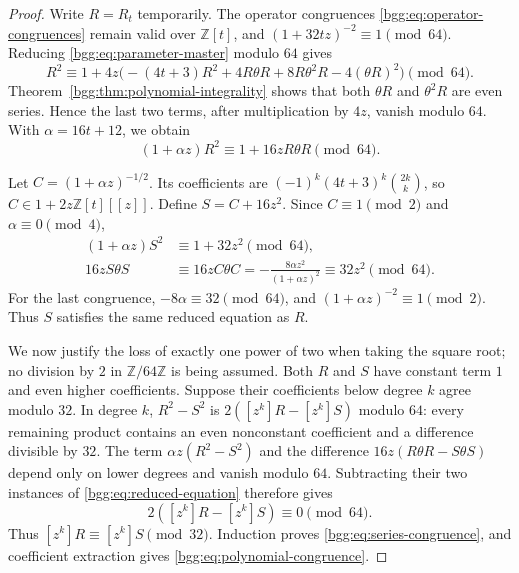 \documentclass[11pt,a4paper]{article}
\numberwithin{equation}{section}
\theoremstyle{definition}
\theoremstyle{remark}
\theoremstyle{definition}
\newcommand{\Z}{\mathbb Z}
\begin{document}
\begin{proof}
Write $R=R_t$ temporarily. The operator congruences
\eqref{bgg:eq:operator-congruences} remain valid over $\Z[t]$, and
$(1+32tz)^{-2}\equiv1\pmod{64}$. Reducing
\eqref{bgg:eq:parameter-master} modulo $64$ gives
\begin{equation}\label{bgg:eq:mod64-intermediate}
 R^2\equiv1+4z\bigl(-(4t+3)R^2+4R\theta R
                 +8R\theta^2R-4(\theta R)^2\bigr)\pmod{64}.
\end{equation}
Theorem~\ref{bgg:thm:polynomial-integrality} shows that both $\theta R$ and
$\theta^2R$ are even series. Hence the last two terms, after multiplication
by $4z$, vanish modulo $64$. With $\alpha=16t+12$, we obtain
\begin{equation}\label{bgg:eq:reduced-equation}
 (1+\alpha z)R^2\equiv1+16zR\theta R\pmod{64}.
\end{equation}

Let $C=(1+\alpha z)^{-1/2}$. Its coefficients are
$(-1)^k(4t+3)^k\binom{2k}{k}$, so $C\in1+2z\Z[t][[z]]$. Define
$S=C+16z^2$. Since $C\equiv1\pmod2$ and $\alpha\equiv0\pmod4$,
\begin{align*}
 (1+\alpha z)S^2&\equiv1+32z^2\pmod{64},\\
 16zS\theta S&\equiv16zC\theta C
       =-\frac{8\alpha z^2}{(1+\alpha z)^2}
       \equiv32z^2\pmod{64}.
\end{align*}
For the last congruence, $-8\alpha\equiv32\pmod{64}$, and
$(1+\alpha z)^{-2}\equiv1\pmod2$. Thus $S$ satisfies the same reduced
equation as $R$.

We now justify the loss of exactly one power of two when taking the square
root; no division by $2$ in $\Z/64\Z$ is being assumed. Both $R$ and $S$
have constant term $1$ and even higher coefficients. Suppose their
coefficients below degree $k$ agree modulo $32$. In degree $k$,
$R^2-S^2$ is $2([z^k]R-[z^k]S)$ modulo $64$: every remaining product
contains an even nonconstant coefficient and a difference divisible by $32$.
The term $\alpha z(R^2-S^2)$ and the difference
$16z(R\theta R-S\theta S)$ depend only on lower degrees and vanish modulo
$64$. Subtracting their two instances of \eqref{bgg:eq:reduced-equation}
therefore gives
\[
 2([z^k]R-[z^k]S)\equiv0\pmod{64}.
\]
Thus $[z^k]R\equiv[z^k]S\pmod{32}$. Induction proves
\eqref{bgg:eq:series-congruence}, and coefficient extraction gives
\eqref{bgg:eq:polynomial-congruence}.
\end{proof}
\end{document}
